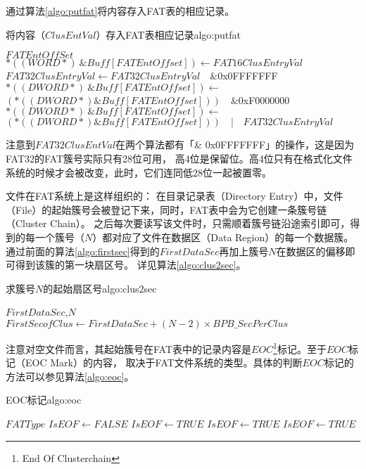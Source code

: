 通过算法\ref{algo:putfat}将内容存入FAT表的相应记录。
\begin{balgo}{将内容（$ClusEntVal$）存入FAT表相应记录}{algo:putfat}
\begin{algorithmic}
\Require $FATEntOffSet$
    \State $*((WORD *)\ \&Buff[FATEntOffset]) \gets FAT16ClusEntryVal$
\Else
    \State $FAT32ClusEntryVal \gets FAT32ClusEntryVal\quad\&$\quad0x0FFFFFFF
    \State $*((DWORD *)\ \&Buff[FATEntOffset]) \gets$
    \State $(*((DWORD *) \&Buff[FATEntOffset]))\quad\&$\quad0xF0000000
    \State $*((DWORD *)\ \&Buff[FATEntOffset]) \gets$
    \State $(*((DWORD *) \&Buff[FATEntOffset]))\quad|\quad FAT32ClusEntryVal$
\EndIf
\end{algorithmic}
\end{balgo}

注意到$FAT32ClusEntVal$在两个算法都有「\& 0x0FFFFFFF」的操作，这是因为FAT32的FAT簇号实际只有28位可用，
高4位是保留位。高4位只有在格式化文件系统的时候才会被改变，此时，它们连同低28位一起被置零。

文件在FAT系统上是这样组织的：
在目录记录表（Directory Entry）中，文件（File）的起始簇号会被登记下来，同时，FAT表中会为它创建一条簇号链（Cluster Chain）。
之后每次要读写该文件时，只需顺着簇号链沿途索引即可，得到的每一个簇号（$N$）都对应了文件在数据区（Data Region）的每一个数据簇。
通过前面的算法\ref{algo:firstsec}得到的$FirstDataSec$再加上簇号$N$在数据区的偏移即可得到该簇的第一块扇区号。
详见算法\ref{algo:clus2sec}。
\begin{balgo}{求簇号$N$的起始扇区号}{algo:clus2sec}
\begin{algorithmic}
\Require $FirstDataSec$,$N$
\State $FirstSecofClus \gets FirstDataSec + (N - 2)\times BPB\_SecPerClus$
\State{}
\end{algorithmic}
\end{balgo}

注意对空文件而言，其起始簇号在FAT表中的记录内容是$EOC$\footnote{End Of Clusterchain}标记。至于$EOC$标记（EOC Mark）的内容，
取决于FAT文件系统的类型。具体的判断$EOC$标记的方法可以参见算法\ref{algo:eoc}。
\begin{balgo}{EOC标记}{algo:eoc}
\begin{algorithmic}
\Require $FATType$
\State $IsEOF \gets FALSE$
    \State$IsEOF \gets TRUE$
    \EndIf
{}
    \State $IsEOF \gets TRUE$
    \EndIf
{}
    \State $IsEOF \gets TRUE$
    \EndIf
\EndIf
\end{algorithmic}
\end{balgo}


